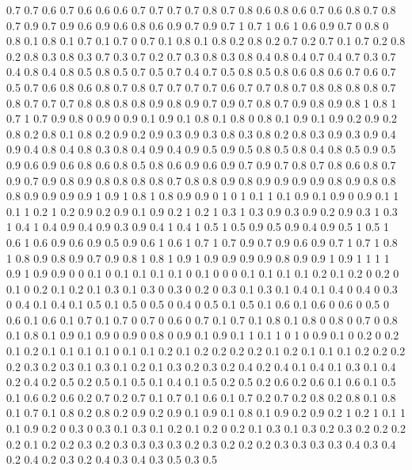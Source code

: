 0.7 0.7
0.6 0.7
0.6 0.6
0.6 0.7
0.7 0.7
0.7 0.8
0.7 0.8
0.6 0.8
0.6 0.7
0.6 0.8
0.7 0.8
0.7 0.9
0.7 0.9
0.6 0.9
0.6 0.8
0.6 0.9
0.7 0.9
0.7 1
0.7 1
0.6 1
0.6 0.9
0.7 0
0.8 0
0.8 0.1
0.8 0.1
0.7 0.1
0.7 0
0.7 0.1
0.8 0.1
0.8 0.2
0.8 0.2
0.7 0.2
0.7 0.1
0.7 0.2
0.8 0.2
0.8 0.3
0.8 0.3
0.7 0.3
0.7 0.2
0.7 0.3
0.8 0.3
0.8 0.4
0.8 0.4
0.7 0.4
0.7 0.3
0.7 0.4
0.8 0.4
0.8 0.5
0.8 0.5
0.7 0.5
0.7 0.4
0.7 0.5
0.8 0.5
0.8 0.6
0.8 0.6
0.7 0.6
0.7 0.5
0.7 0.6
0.8 0.6
0.8 0.7
0.8 0.7
0.7 0.7
0.7 0.6
0.7 0.7
0.8 0.7
0.8 0.8
0.8 0.8
0.7 0.8
0.7 0.7
0.7 0.8
0.8 0.8
0.8 0.9
0.8 0.9
0.7 0.9
0.7 0.8
0.7 0.9
0.8 0.9
0.8 1
0.8 1
0.7 1
0.7 0.9
0.8 0
0.9 0
0.9 0.1
0.9 0.1
0.8 0.1
0.8 0
0.8 0.1
0.9 0.1
0.9 0.2
0.9 0.2
0.8 0.2
0.8 0.1
0.8 0.2
0.9 0.2
0.9 0.3
0.9 0.3
0.8 0.3
0.8 0.2
0.8 0.3
0.9 0.3
0.9 0.4
0.9 0.4
0.8 0.4
0.8 0.3
0.8 0.4
0.9 0.4
0.9 0.5
0.9 0.5
0.8 0.5
0.8 0.4
0.8 0.5
0.9 0.5
0.9 0.6
0.9 0.6
0.8 0.6
0.8 0.5
0.8 0.6
0.9 0.6
0.9 0.7
0.9 0.7
0.8 0.7
0.8 0.6
0.8 0.7
0.9 0.7
0.9 0.8
0.9 0.8
0.8 0.8
0.8 0.7
0.8 0.8
0.9 0.8
0.9 0.9
0.9 0.9
0.8 0.9
0.8 0.8
0.8 0.9
0.9 0.9
0.9 1
0.9 1
0.8 1
0.8 0.9
0.9 0
1 0
1 0.1
1 0.1
0.9 0.1
0.9 0
0.9 0.1
1 0.1
1 0.2
1 0.2
0.9 0.2
0.9 0.1
0.9 0.2
1 0.2
1 0.3
1 0.3
0.9 0.3
0.9 0.2
0.9 0.3
1 0.3
1 0.4
1 0.4
0.9 0.4
0.9 0.3
0.9 0.4
1 0.4
1 0.5
1 0.5
0.9 0.5
0.9 0.4
0.9 0.5
1 0.5
1 0.6
1 0.6
0.9 0.6
0.9 0.5
0.9 0.6
1 0.6
1 0.7
1 0.7
0.9 0.7
0.9 0.6
0.9 0.7
1 0.7
1 0.8
1 0.8
0.9 0.8
0.9 0.7
0.9 0.8
1 0.8
1 0.9
1 0.9
0.9 0.9
0.9 0.8
0.9 0.9
1 0.9
1 1
1 1
0.9 1
0.9 0.9
0 0
0.1 0
0.1 0.1
0.1 0.1
0 0.1
0 0
0 0.1
0.1 0.1
0.1 0.2
0.1 0.2
0 0.2
0 0.1
0 0.2
0.1 0.2
0.1 0.3
0.1 0.3
0 0.3
0 0.2
0 0.3
0.1 0.3
0.1 0.4
0.1 0.4
0 0.4
0 0.3
0 0.4
0.1 0.4
0.1 0.5
0.1 0.5
0 0.5
0 0.4
0 0.5
0.1 0.5
0.1 0.6
0.1 0.6
0 0.6
0 0.5
0 0.6
0.1 0.6
0.1 0.7
0.1 0.7
0 0.7
0 0.6
0 0.7
0.1 0.7
0.1 0.8
0.1 0.8
0 0.8
0 0.7
0 0.8
0.1 0.8
0.1 0.9
0.1 0.9
0 0.9
0 0.8
0 0.9
0.1 0.9
0.1 1
0.1 1
0 1
0 0.9
0.1 0
0.2 0
0.2 0.1
0.2 0.1
0.1 0.1
0.1 0
0.1 0.1
0.2 0.1
0.2 0.2
0.2 0.2
0.1 0.2
0.1 0.1
0.1 0.2
0.2 0.2
0.2 0.3
0.2 0.3
0.1 0.3
0.1 0.2
0.1 0.3
0.2 0.3
0.2 0.4
0.2 0.4
0.1 0.4
0.1 0.3
0.1 0.4
0.2 0.4
0.2 0.5
0.2 0.5
0.1 0.5
0.1 0.4
0.1 0.5
0.2 0.5
0.2 0.6
0.2 0.6
0.1 0.6
0.1 0.5
0.1 0.6
0.2 0.6
0.2 0.7
0.2 0.7
0.1 0.7
0.1 0.6
0.1 0.7
0.2 0.7
0.2 0.8
0.2 0.8
0.1 0.8
0.1 0.7
0.1 0.8
0.2 0.8
0.2 0.9
0.2 0.9
0.1 0.9
0.1 0.8
0.1 0.9
0.2 0.9
0.2 1
0.2 1
0.1 1
0.1 0.9
0.2 0
0.3 0
0.3 0.1
0.3 0.1
0.2 0.1
0.2 0
0.2 0.1
0.3 0.1
0.3 0.2
0.3 0.2
0.2 0.2
0.2 0.1
0.2 0.2
0.3 0.2
0.3 0.3
0.3 0.3
0.2 0.3
0.2 0.2
0.2 0.3
0.3 0.3
0.3 0.4
0.3 0.4
0.2 0.4
0.2 0.3
0.2 0.4
0.3 0.4
0.3 0.5
0.3 0.5
